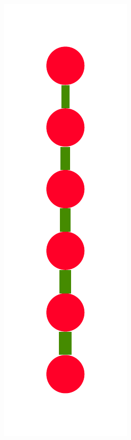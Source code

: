 \documentclass[a4paper,10pt]{article}
\begin{document}
\begin{figure}
{    \includegraphics[scale=.14]{./figures/6-3-recursion-data-3.pdf}
}
\end{figure}
\end{document}
